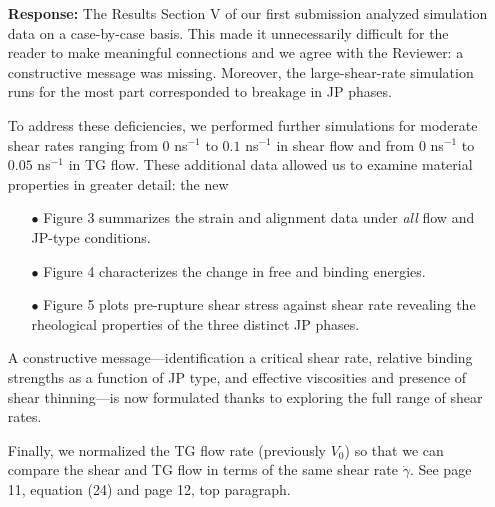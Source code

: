 \documentclass[11pt]{article}
\begin{document}
\begin{itemize}
  \item[] {\bf Response:}
      The Results Section V of our first submission
    analyzed simulation data on a case-by-case basis. 
    This made it unnecessarily difficult for the reader to
    make meaningful connections and we agree with the Reviewer:
    a constructive message was missing.  Moreover,
    the large-shear-rate 
    simulation runs for the most part corresponded to breakage in
    JP phases.

    To address these deficiencies,
    we performed further simulations 
    for moderate shear rates ranging
    from $0$ ns$^{-1}$ to $0.1$ ns$^{-1}$ in shear flow
    and from $0$ ns$^{-1}$ to $0.05$ ns$^{-1}$ in TG flow.
    These additional data allowed us to examine 
    material properties in greater detail: the new
    \begin{itemize}
      \item[$\bullet$] Figure 3 summarizes the strain and alignment data
        under \emph{all} flow and JP-type conditions.
      \item[$\bullet$] Figure 4 characterizes the change in free and binding energies.
      \item[$\bullet$] Figure 5 plots pre-rupture
        shear stress against shear rate revealing the rheological properties of
        the three distinct JP phases.    
    \end{itemize}
    A constructive message---identification a critical shear rate,
    relative binding strengths as a function of JP type,
    and effective viscosities and presence of shear thinning---is
    now formulated thanks to exploring the full range of
    shear rates.

    Finally, we normalized the TG flow rate (previously $V_0$)
    so that we can compare the shear and TG flow in terms of the same
    shear rate $\dot \gamma$.  See page 11, equation (24) and page 12,
    top paragraph.
\end{itemize}
\end{document}
